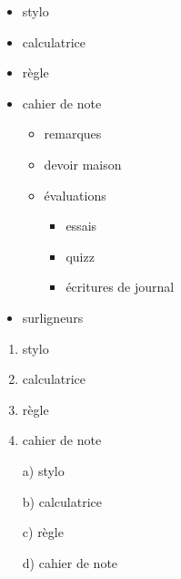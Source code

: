 \documentclass[11pt]{article}
\begin{document}
\begin{itemize}

\item stylo
\item calculatrice
\item règle
\item cahier de note
	\begin{itemize}
	\item remarques
	\item devoir maison
	\item évaluations
	
		\begin{itemize}
		\item essais
		\item quizz
		\item écritures de journal
		\end{itemize}
	\end{itemize}
\item surligneurs
\end{itemize}


\vspace{1cm}

\begin{enumerate}
\item stylo
\item calculatrice
\item règle
\item cahier de note
\end{enumerate}


\pagebreak

\begin{enumerate}
\item[a)] stylo
\item[b)] calculatrice
\item[c)] règle
\item[d)] cahier de note
\end{enumerate}
\end{document}
